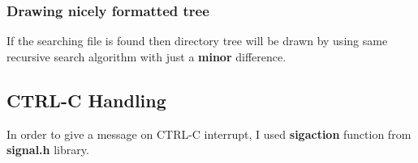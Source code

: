 \documentclass{article}
\begin{document}
\subsubsection{Drawing nicely formatted tree}
If the searching file is found then directory tree will be drawn by using same recursive search algorithm with just a \textbf{minor} difference. 
\subsection{CTRL-C Handling}
In order to give a message on CTRL-C interrupt, I used \textbf{sigaction} function from \textbf{signal.h} library.
\end{document}
